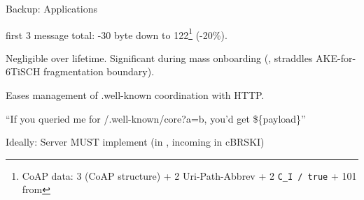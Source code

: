\begin{frame}{\color{gray}Backup: Applications}\large
  \begin{description}
    \item[\color{gray}EDHOC] \color{gray}first 3 message total: -30 byte down to 122\footnote{CoAP data: 3  (CoAP structure) + 2  Uri-Path-Abbrev + 2  \texttt{C\_I / true} + 101 from } (-20\%).

      \bigskip

      Negligible over lifetime. Significant during mass onboarding (, straddles AKE-for-6TiSCH fragmentation boundary).

      \bigskip

    \item[\color{gray}EST/cBRSKI] \color{gray}Eases management of .well-known coordination with HTTP.

      \bigskip

    \item[\color{gray}\texttt{-responses}] \color{gray}``If you queried me for /.well-known/core?a=b, you'd get \$\{payload\}''
  \end{description}

  \vspace{1.5cm}

  \color{gray}Ideally: Server MUST implement (in , incoming in cBRSKI)
\end{frame}


